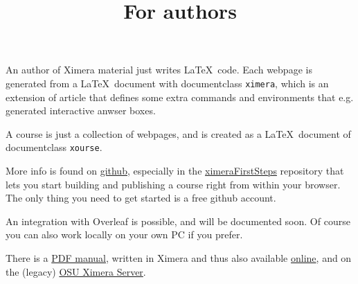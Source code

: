 \documentclass{ximera}
\title{For authors}
\begin{document}
\begin{abstract}
\end{abstract}
\maketitle

An author of Ximera material just writes \LaTeX\ code. 
Each webpage is generated from a \LaTeX\ document with documentclass \verb|ximera|, which is an extension of article that defines some extra commands and environments that e.g. generated interactive anwser boxes.

A course is just a collection of webpages, and is created as a \LaTeX\ document of documentclass \verb|xourse|.

More info is found on \href{https://github.com/XimeraProject}{github}, 
especially in the \href{https://github.com/XimeraProject/ximeraFirstSteps}{ximeraFirstSteps} repository that lets you start building and publishing a course right from within your browser.
The only thing you need to get started is a free github account.

An integration with Overleaf is possible, and will be documented soon.
Of course you can also work locally on your own PC if you prefer.

There is a \href{https://github.com/XimeraProject/ximeraManuals/releases/download/v1.5.0/ximeraUserManual.pdf}{PDF manual}, 
written in Ximera and thus also available 
\href{https://xerxes.ximera.org/xmanual/ximeraUserManual/introductionAndSetup/aboutXimera}{online}, and 
on the (legacy) \href{https://ximera.osu.edu/xmanual/ximeraUserManual/introductionAndSetup/aboutXimera}{OSU Ximera Server}.
\end{document}
